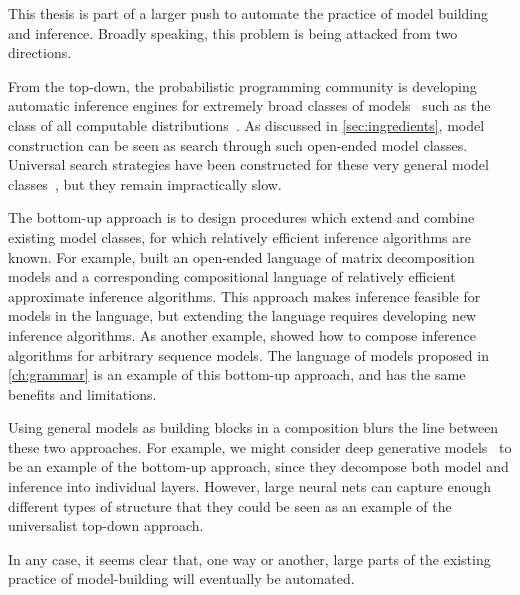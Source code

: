This thesis is part of a larger push to automate the practice of model building and inference.
Broadly speaking, this problem is being attacked from two directions.

From the top-down, the probabilistic programming community is developing automatic inference engines for extremely broad classes of models~\citep{goodman2008church,mansinghka2014venture,liang2010learning} such as the class of all computable distributions~\citep{solomonoff1964formal, li2009introduction}.
As discussed in \cref{sec:ingredients}, model construction can be seen as search through such open-ended model classes.
Universal search strategies have been constructed for these very general model classes~\citep{hutter2002fastest,schmidhuber2002speed,levin1973universal}, but they remain impractically slow.

The bottom-up approach is to design procedures which extend and combine existing model classes, for which relatively efficient inference algorithms are known.
For example, \citet{roger-grosse-thesis} built an open-ended language of matrix decomposition models and a corresponding compositional language of relatively efficient approximate inference algorithms.
This approach makes inference feasible for models in the language, but extending the language requires developing new inference algorithms.
As another example, \citet{christian-thesis} showed how to compose inference algorithms for arbitrary sequence models.
The language of models proposed in \cref{ch:grammar} is an example of this bottom-up approach, and has the same benefits and limitations. %

Using general models as building blocks in a composition blurs the line between these two approaches.
For example, we might consider deep generative models~\citep{adams2010learning,damianou2012deep,rippel2013high,bengio2013generalized,salakhutdinov2009deep} to be an example of the bottom-up approach, since they decompose both model and inference into individual layers.
However, large neural nets can capture enough different types of structure that they could be seen as an example of the universalist top-down approach.

In any case, it seems clear that, one way or another, large parts of the existing practice of model-building will eventually be automated.

